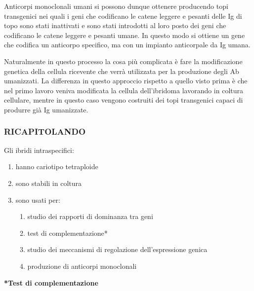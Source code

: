 \documentclass[11pt]{book}
\begin{document}
Anticorpi monoclonali umani si possono dunque ottenere producendo topi transgenici nei quali i geni che codificano le catene leggere e pesanti delle Ig di topo sono stati inattivati e sono stati introdotti al loro posto dei geni che codificano le catene leggere e pesanti umane.
In questo modo si ottiene un gene che codifica un anticorpo specifico, ma con un impianto anticorpale da Ig umana.

Naturalmente in questo processo la cosa più complicata è fare la modificazione genetica della cellula ricevente che verrà utilizzata per la produzione degli Ab umanizzati.
La differenza in questo approccio rispetto a quello visto prima è che nel primo lavoro veniva modificata la cellula dell’ibridoma lavorando in coltura cellulare, mentre in questo caso vengono costruiti dei topi transgenici capaci di produrre già Ig umanizzate.

\subsubsection{RICAPITOLANDO} 
Gli ibridi intraspecifici:
\begin{enumerate}
\item hanno cariotipo tetraploide
\item sono stabili in coltura
\item sono usati per:

	\begin{enumerate}
		\item studio dei rapporti di dominanza tra geni
		\item test di complementazione*
        \item studio dei meccanismi di regolazione dell’espressione genica 
        \item produzione di anticorpi monoclonali
        \end{enumerate}
\end{enumerate}

\textbf{*Test di complementazione}
\end{document}
